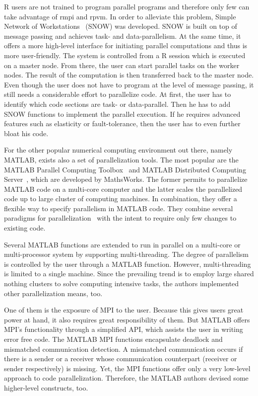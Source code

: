 R users are not trained to program parallel programs and therefore only few can take advantage of rmpi and rpvm.
In order to alleviate this problem, Simple Network of Workstations~\cite{tierney:pv0hros2008a} (SNOW) was developed.
SNOW is built on top of message passing and achieves task- and data-parallelism.
At the same time, it offers a more high-level interface for initiating parallel computations and thus is more user-friendly.
The system is controlled from a R session which is executed on a master node.
From there, the user can start parallel tasks on the worker nodes.
The result of the computation is then transferred back to the master node.
Even though the user does not have to program at the level of message passing, it still needs a considerable effort to parallelize code.
At first, the user has to identify which code sections are task- or data-parallel.
Then he has to add SNOW functions to implement the parallel execution.
If he requires advanced features such as elasticity or fault-tolerance, then the user has to even further bloat his code.

For the other popular numerical computing environment out there, namely MATLAB, exists also a set of parallelization tools.
The most popular are the MATLAB Parallel Computing Toolbox~\cite{parallelComputingToolbox} and MATLAB Distributed Computing Server~\cite{distributedComputingServer}, which are developed by MathsWorks.
The former permits to parallelize MATLAB code on a multi-core computer and the latter scales the parallelized code up to large cluster of computing machines.
In combination, they offer a flexible way to specify parallelism in MATLAB code.
They combine several paradigms for parallelization~\cite{sharma:ijpp2009a} with the intent to require only few changes to existing code.

Several MATLAB functions are extended to run in parallel on a multi-core or multi-processor system by supporting multi-threading.
The degree of parallelism is controlled by the user through a MATLAB function.
However, multi-threading is limited to a single machine.
Since the prevailing trend is to employ large shared nothing clusters to solve computing intensive tasks, the authors implemented other parallelization means, too.

One of them is the exposure of MPI to the user.
Because this gives users great power at hand, it also requires great responsibility of them.
But MATLAB offers MPI's functionality through a simplified API, which assists the user in writing error free code.
The MATLAB MPI functions encapsulate deadlock and mismatched communication detection.
A mismatched communication occurs if there is a sender or a receiver whose communication counterpart (receiver or sender respectively) is missing.
Yet, the MPI functions offer only a very low-level approach to code parallelization.
Therefore, the MATLAB authors devised some higher-level constructs, too.

